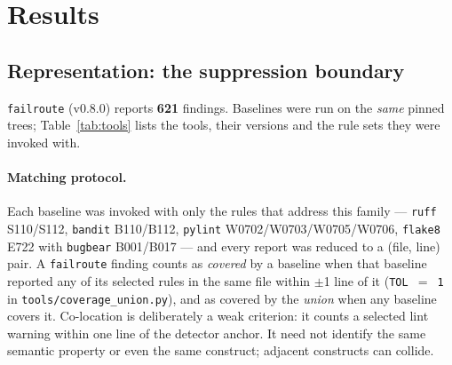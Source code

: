 \documentclass[10pt,a4paper]{article}
\begin{document}
\section{Results}

\subsection{Representation: the suppression boundary}
\label{sec:rq1}

\texttt{failroute} (v0.8.0) reports \textbf{621} findings. Baselines were run on
the \emph{same} pinned trees; Table~\ref{tab:tools} lists the tools, their
versions and the rule sets they were invoked with.

\paragraph{Matching protocol.} Each baseline was invoked with only the rules that
address this family --- \texttt{ruff} S110/S112, \texttt{bandit} B110/B112,
\texttt{pylint} W0702/W0703/W0705/W0706, \texttt{flake8} E722 with
\texttt{bugbear} B001/B017 --- and every report was reduced to a (file, line)
pair. A \texttt{failroute} finding counts as \emph{covered} by a baseline when
that baseline reported any of its selected rules in the same file within $\pm$1
line of it (\texttt{TOL $=$ 1} in \texttt{tools/coverage\_union.py}), and as
covered by the \emph{union} when any baseline covers it. Co-location is
deliberately a weak criterion: it counts a selected lint warning within one
line of the detector anchor. It need not identify the same semantic property
or even the same construct; adjacent constructs can collide.
\end{document}

